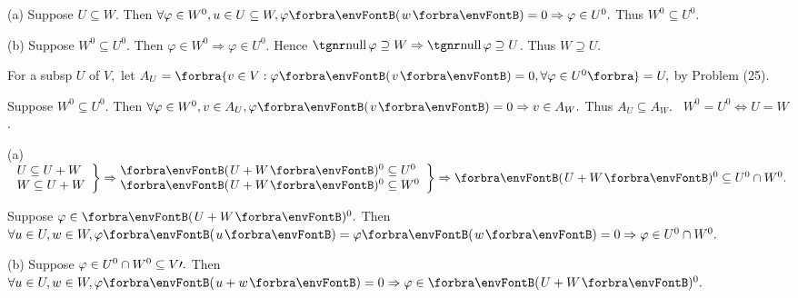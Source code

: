 \documentclass[a4paper, 11pt, UTF8]{article}
\begin{document}
\begin{large}
\par\quad
(a) Suppose $U\subseteq W.$ Then $\forall\varphi\in W^0,u\in U\subseteq W,\varphi\Par{w}=0\Rightarrow\varphi\in U^0.$ Thus $W^0\subseteq U^0.$\par\quad
(b) Suppose $W^0\subseteq U^0.$ Then $\varphi\in W^0\Rightarrow\varphi\in U^0.$ Hence $\null\varphi\supseteq W\Rightarrow\null\varphi\supseteq U$.  Thus $W\supseteq U.$\vspace{4pt}\par\quad\Hb
\Or For a subsp $U$ of $V,$ let $A_U=\Bra{v\in V:\varphi\Par{v}=0,\forall\varphi\in U^0}=U,$ by Problem (25).\par\quad\Hb
Suppose $W^0\subseteq U^0.$ Then $\forall\varphi\in W^0,v\in A_U,\varphi\Par{v}=0\Rightarrow v\in A_W.$ Thus $A_U\subseteq A_W.$\PfEnd
\Corollary \,\,\,{\Large $W^0=U^0\Longleftrightarrow U=W$.}\par
\SepLine\pagebreak

\vspace{2pt}\par\quad
(a) $\MathRightBrace{l}{U\subseteq U+W\\W\subseteq U+W}\Rightarrow\hspace{-6pt}\MathRightBrace{l}{\Par{U+W}{^0}\subseteq U^0 \\ \Par{U+W}{^0}\subseteq W^0}\Rightarrow\Par{U+W}{^0}\subseteq U^0\cap W^0.$\vspace{4pt}\par\quad\Ha
\Or Suppose $\varphi\in\Par{U+W}{^0}.$ Then $\forall u\in U,w\in W,\varphi\Par{u}=\varphi\Par{w}=0\Rightarrow\varphi\in U^0\cap W^0.$\vspace{4pt}\par\quad
(b) Suppose $\varphi\in U^0\cap W^0\subseteq V\prime.$ Then $\forall u\in U,w\in W,\varphi\Par{u+w}=0\Rightarrow\varphi\in \Par{U+W}{^0}.$\PfEnd
\SepLine


\end{large}
\end{document}
